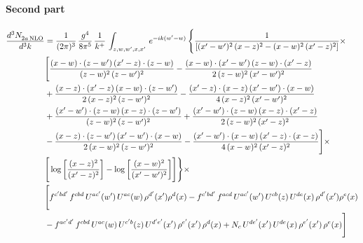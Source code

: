 \documentclass[9pt]{article}
\numberwithin{equation}{section}
\begin{document}
\paragraph{Second part}
\begin{align}
    \frac{d^{3}N_{2a\,\rm NLO}^{\rm}}{d^{3}k}  & =  \frac{1}{(2\pi)^{3}}\, \frac{g^{4}}{8\pi^{5}}\,\frac{1}{k^{+}}\,\int_{z,w,w^{\prime},x,x'}\, e^{-ik(w^{\prime}-w)}\, \Bigg\{ \frac{1}{\left[(x'-w')^{2}\, (x-z)^{2}-(x-w)^{2}\, (x'-z)^{2}\right]}\times\,\notag \\ & \Bigg[\frac{(x-w)\cdot (z-w')\, (x'-z)\cdot (z-w)}{(z-w)^{2}\,(z-w')^{2}}-\frac{(x-w)\cdot (x'-w')\, (z-w)\cdot (x'-z)}{2\, (z-w)^{2}\, (x'-w')^{2}}\notag \\ & + \frac{(x-z)\cdot (x'-z)\, (x-w)\cdot (z-w')}{2\, (x-z)^{2}\, (z-w')^{2}}-\frac{(x'-z)\cdot (x-z)\, (x'-w')\cdot (x-w)}{4\, (x-z)^{2}\, (x'-w')^{2}}\notag \\ & + \frac{(x'-w')\cdot (z-w)\, (x-z)\cdot (z-w')}{(z-w)^{2}\,(z-w')^{2}}+\frac{(x'-w')\cdot (z-w)\, (x-z)\cdot (x'-z)}{2\, (z-w)^{2}\, (x'-z)^{2}}\notag \\ & - \frac{(x-z)\cdot (z-w')\, (x'-w')\cdot (x-w)}{2\, (x-w)^{2}\, (z-w')^{2}} -\frac{(x'-w')\cdot (x-w)\, (x'-z)\cdot (x-z)}{4\, (x-w)^{2}\, (x'-z)^{2}}\Bigg]\times\notag \\ &  \Bigg[\log{\left[\frac{(x-z)^{2}}{ (x'-z)^{2}}\right]}-\log{\left[\frac{(x-w)^{2}}{(x'-w')^{2}}\right]}\Bigg]\Bigg\} \times\, \notag \\ & \Bigg[f^{c'bd'}\,f^{cbd}\, U^{ac'}(w')\,U^{ac}(w)\,\rho^{d'}(x')\rho^{d}(x)- f^{c'bd'}\,f^{acd}\,U^{ac'}(w')\,U^{cb}(z)\,U^{de}(x)\,\rho^{d'}(x')\rho^{e}(x) \notag \\ & -f^{ac'd'}\,f^{cbd}\,U^{ac}(w)\,U^{c'b}(z)\,U^{d'e'}(x')\,\rho^{e'}(x')\,\rho^{d}(x) +N_{c}\,U^{de'}(x')\,U^{de}(x)\,\rho^{e'}(x')\,\rho^{e}(x)\Bigg]
\end{align}
\end{document}
